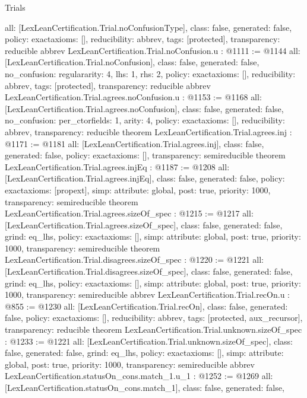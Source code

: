 \begin{lexlean}{Trials}
\begin{coremodule}
{  all: [LexLeanCertification.Trial.noConfusionType],
  class: false,
  generated: false,
  policy: exact{axioms: []},
  reducibility: abbrev{},
  tags: [protected],
  transparency: reducible
}
abbrev LexLeanCertification.Trial.noConfusion.{u} : @1111 := @1144 {
  all: [LexLeanCertification.Trial.noConfusion],
  class: false,
  generated: false,
  no_confusion: regular{arity: 4, lhs: 1, rhs: 2},
  policy: exact{axioms: []},
  reducibility: abbrev{},
  tags: [protected],
  transparency: reducible
}
abbrev LexLeanCertification.Trial.agrees.noConfusion.{u} : @1153 := @1168 {
  all: [LexLeanCertification.Trial.agrees.noConfusion],
  class: false,
  generated: false,
  no_confusion: per_ctor{fields: 1, arity: 4},
  policy: exact{axioms: []},
  reducibility: abbrev{},
  transparency: reducible
}
theorem LexLeanCertification.Trial.agrees.inj : @1171 := @1181 {
  all: [LexLeanCertification.Trial.agrees.inj],
  class: false,
  generated: false,
  policy: exact{axioms: []},
  transparency: semireducible
}
theorem LexLeanCertification.Trial.agrees.injEq : @1187 := @1208 {
  all: [LexLeanCertification.Trial.agrees.injEq],
  class: false,
  generated: false,
  policy: exact{axioms: [propext]},
  simp: {attribute: global, post: true, priority: 1000},
  transparency: semireducible
}
theorem LexLeanCertification.Trial.agrees.sizeOf_spec : @1215 := @1217 {
  all: [LexLeanCertification.Trial.agrees.sizeOf_spec],
  class: false,
  generated: false,
  grind: eq_lhs,
  policy: exact{axioms: []},
  simp: {attribute: global, post: true, priority: 1000},
  transparency: semireducible
}
theorem LexLeanCertification.Trial.disagrees.sizeOf_spec : @1220 := @1221 {
  all: [LexLeanCertification.Trial.disagrees.sizeOf_spec],
  class: false,
  generated: false,
  grind: eq_lhs,
  policy: exact{axioms: []},
  simp: {attribute: global, post: true, priority: 1000},
  transparency: semireducible
}
abbrev LexLeanCertification.Trial.recOn.{u} : @855 := @1230 {
  all: [LexLeanCertification.Trial.recOn],
  class: false,
  generated: false,
  policy: exact{axioms: []},
  reducibility: abbrev{},
  tags: [protected, aux_recursor],
  transparency: reducible
}
theorem LexLeanCertification.Trial.unknown.sizeOf_spec : @1233 := @1221 {
  all: [LexLeanCertification.Trial.unknown.sizeOf_spec],
  class: false,
  generated: false,
  grind: eq_lhs,
  policy: exact{axioms: []},
  simp: {attribute: global, post: true, priority: 1000},
  transparency: semireducible
}
abbrev LexLeanCertification.statusOn_cons.match_1.{u_1} : @1252 := @1269 {
  all: [LexLeanCertification.statusOn_cons.match_1],
  class: false,
  generated: false,
}
\end{coremodule}
\end{lexlean}
